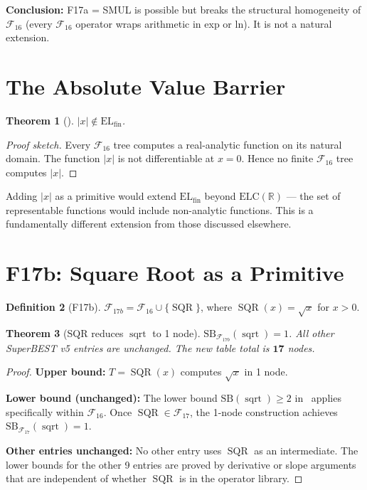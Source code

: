 \documentclass[12pt,a4paper]{article}
\newtheorem{theorem}{Theorem}[section]
\theoremstyle{definition}
\newtheorem{definition}[theorem]{Definition}
\theoremstyle{remark}
\newcommand{\sqrtop}{\operatorname{sqrt}}
\newcommand{\SQR}{\operatorname{SQR}}
\newcommand{\SB}{\mathrm{SB}}
\newcommand{\F}{\mathcal{F}_{16}}
\newcommand{\Fs}{\mathcal{F}_{17}}
\newcommand{\ELC}{\mathrm{ELC}(\mathbb{R})}
\newcommand{\ELfin}{\mathrm{EL}_{\mathrm{fin}}}
\begin{document}
\textbf{Conclusion:} F17a = SMUL is possible but breaks the structural
homogeneity of $\F$ (every $\F$ operator wraps arithmetic in exp or ln).
It is not a natural extension.

\section{The Absolute Value Barrier}
\label{sec:abs}

\begin{theorem}[\cite{F16Char}]
$|x|\notin\ELfin$.
\end{theorem}

\begin{proof}[Proof sketch]
Every $\F$ tree computes a real-analytic function on its natural domain.
The function $|x|$ is not differentiable at $x=0$.  Hence no finite $\F$
tree computes $|x|$.
\end{proof}

\noindent Adding $|x|$ as a primitive would extend $\ELfin$ beyond $\ELC$ ---
the set of representable functions would include non-analytic functions.
This is a fundamentally different extension from those discussed elsewhere.

\section{F17b: Square Root as a Primitive}
\label{sec:sqrt-primitive}

\begin{definition}[F17b]
$\mathcal{F}_{17b} = \F \cup \{\SQR\}$, where $\SQR(x) = \sqrt{x}$ for $x>0$.
\end{definition}

\begin{theorem}[SQR reduces $\sqrtop$ to 1 node]
\label{thm:sqr}
$\SB_{\mathcal{F}_{17b}}(\sqrtop) = 1$.
All other SuperBEST v5 entries are unchanged.
The new table total is $\mathbf{17}$ nodes.
\end{theorem}

\begin{proof}
\textbf{Upper bound:} $T = \SQR(x)$ computes $\sqrt{x}$ in 1 node.

\textbf{Lower bound (unchanged):} The lower bound $\SB(\sqrtop)\ge 2$
in~\cite{SBv5} applies specifically within $\F$.  Once $\SQR\in\Fs$,
the 1-node construction achieves $\SB_{\Fs}(\sqrtop) = 1$.

\textbf{Other entries unchanged:} No other entry uses $\SQR$ as an
intermediate.  The lower bounds for the other 9 entries are proved by
derivative or slope arguments that are independent of whether $\SQR$ is
in the operator library.
\end{proof}
\end{document}
